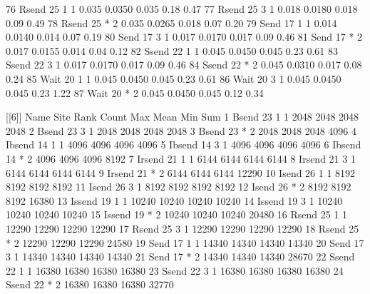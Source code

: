 \begin{Output}
76         Rsend   25    1     1 0.035 0.0350 0.035  0.18  0.47
77         Rsend   25    3     1 0.018 0.0180 0.018  0.09  0.49
78         Rsend   25    *     2 0.035 0.0265 0.018  0.07  0.20
79          Send   17    1     1 0.014 0.0140 0.014  0.07  0.19
80          Send   17    3     1 0.017 0.0170 0.017  0.09  0.46
81          Send   17    *     2 0.017 0.0155 0.014  0.04  0.12
82         Ssend   22    1     1 0.045 0.0450 0.045  0.23  0.61
83         Ssend   22    3     1 0.017 0.0170 0.017  0.09  0.46
84         Ssend   22    *     2 0.045 0.0310 0.017  0.08  0.24
85          Wait   20    1     1 0.045 0.0450 0.045  0.23  0.61
86          Wait   20    3     1 0.045 0.0450 0.045  0.23  1.22
87          Wait   20    *     2 0.045 0.0450 0.045  0.12  0.34

[[6]]
     Name Site Rank Count   Max  Mean   Min   Sum
1   Bsend   23    1     1  2048  2048  2048  2048
2   Bsend   23    3     1  2048  2048  2048  2048
3   Bsend   23    *     2  2048  2048  2048  4096
4  Ibsend   14    1     1  4096  4096  4096  4096
5  Ibsend   14    3     1  4096  4096  4096  4096
6  Ibsend   14    *     2  4096  4096  4096  8192
7  Irsend   21    1     1  6144  6144  6144  6144
8  Irsend   21    3     1  6144  6144  6144  6144
9  Irsend   21    *     2  6144  6144  6144 12290
10  Isend   26    1     1  8192  8192  8192  8192
11  Isend   26    3     1  8192  8192  8192  8192
12  Isend   26    *     2  8192  8192  8192 16380
13 Issend   19    1     1 10240 10240 10240 10240
14 Issend   19    3     1 10240 10240 10240 10240
15 Issend   19    *     2 10240 10240 10240 20480
16  Rsend   25    1     1 12290 12290 12290 12290
17  Rsend   25    3     1 12290 12290 12290 12290
18  Rsend   25    *     2 12290 12290 12290 24580
19   Send   17    1     1 14340 14340 14340 14340
20   Send   17    3     1 14340 14340 14340 14340
21   Send   17    *     2 14340 14340 14340 28670
22  Ssend   22    1     1 16380 16380 16380 16380
23  Ssend   22    3     1 16380 16380 16380 16380
24  Ssend   22    *     2 16380 16380 16380 32770
\end{Output}

